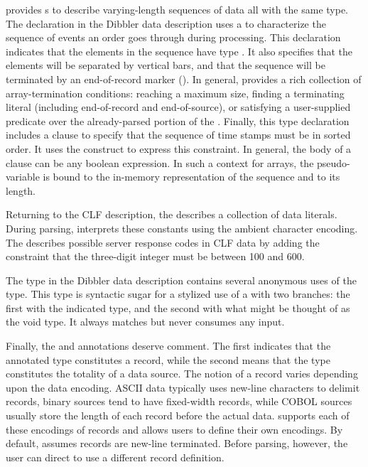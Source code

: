 \documentclass{sig-alternate}
\begin{document}
\pads{} provides s to describe varying-length sequences of data all 
with the same type.  The  declaration in the Dibbler data description
uses a  to characterize the sequence of events an
order goes through during processing.  This declaration indicates that the elements
in the sequence have type .  It also specifies that the elements will
be separated by vertical bars, and that the sequence will be terminated by 
an end-of-record marker ().  In general, \pads{} provides a rich collection
of array-termination conditions: reaching a maximum size, finding a terminating
literal (including end-of-record and end-of-source),
or satisfying a user-supplied predicate over the already-parsed portion of 
the .  Finally, this type declaration includes a  clause
to specify that the sequence of time stamps must be in sorted order.
It uses the  construct to express this constraint.
In general, the body of a  clause can be any boolean expression.
In such a context for arrays, the pseudo-variable  is bound to the in-memory representation of the sequence and  to its length.

Returning to the CLF description, the   describes
a collection of data literals.  During parsing, \pads{} interprets these
constants using the ambient character encoding.  The  
 describes possible server response codes in CLF data by adding
the constraint that the three-digit integer must be between 100 and 600.

The  type in the Dibbler data description contains several
anonymous uses of the  type.  This type is syntactic sugar for a 
stylized use of a  with two branches: the first with the indicated type, and
the second with what might be thought of as the void type.  It always matches but
never consumes any input.

Finally, the  and  annotations deserve comment.  The first
indicates that the annotated type constitutes a record,
while the second means that the type constitutes the totality of a data source.  
The notion of a record varies depending upon the data encoding.  
ASCII data typically uses new-line characters to delimit 
records, binary sources tend to have fixed-width records, while 
COBOL sources usually store the length of each record before the actual data.
\pads{} supports each of these encodings of records and allows users to define
their own encodings.  By default, \pads{} assumes records are new-line terminated.
Before parsing, however, the user can direct \pads{} to use a different record
definition.
\end{document}
